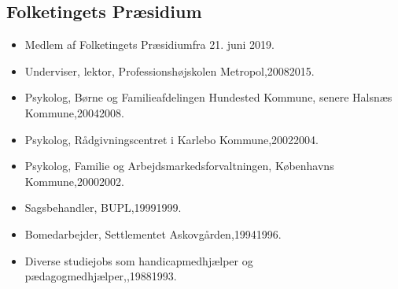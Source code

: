 \documentclass[11pt, a4paper]{awesome-cv}
\begin{document}
\begin{cvletter}
\subsection*{Folketingets Præsidium}
\begin{itemize}
\item Medlem af Folketingets Præsidiumfra 21. juni 2019.
\end{itemize}
\begin{itemize}
\item Underviser, lektor, Professionshøjskolen Metropol,20082015.
\item Psykolog, Børne og Familieafdelingen Hundested Kommune, senere Halsnæs Kommune,20042008.
\item Psykolog, Rådgivningscentret i Karlebo Kommune,20022004.
\item Psykolog, Familie og Arbejdsmarkedsforvaltningen, Københavns Kommune,20002002.
\item Sagsbehandler, BUPL,19991999.
\item Bomedarbejder, Settlementet Askovgården,19941996.
\item Diverse studiejobs som handicapmedhjælper og pædagogmedhjælper,,19881993.
\end{itemize}
\end{cvletter}
\end{document}
